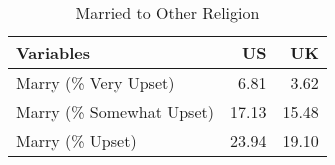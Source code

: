 \documentclass[a4paper]{article}
\begin{document}
\begin{table}[ht]
\begin{center}
\caption{Married to Other Religion}
\label{tab:one}
\begin{tabular}{lrr}
  \hline
Variables & US & UK \\ 
  \hline
Marry (\% Very Upset) & 6.81 & 3.62 \\ 
  Marry (\% Somewhat Upset) & 17.13 & 15.48 \\ 
  Marry (\% Upset) & 23.94 & 19.10 \\ 
   \hline
\end{tabular}
\end{center}
\end{table}
\end{document}
